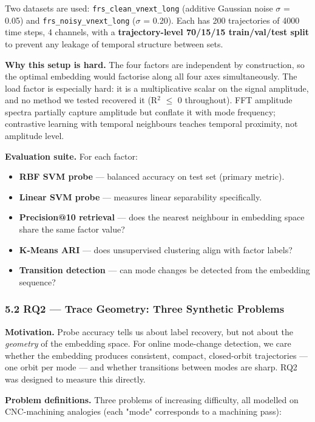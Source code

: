 \documentclass[11pt,a4paper]{article}
\begin{document}
Two datasets are used: \texttt{frs\_clean\_vnext\_long} (additive Gaussian noise $\sigma$ = 0.05) and
\texttt{frs\_noisy\_vnext\_long} ($\sigma$ = 0.20). Each has 200 trajectories of 4000 time steps, 4 channels,
with a \textbf{trajectory-level 70/15/15 train/val/test split} to prevent any leakage of temporal
structure between sets.

\textbf{Why this setup is hard.} The four factors are independent by construction, so the optimal
embedding would factorise along all four axes simultaneously. The load factor is especially hard:
it is a multiplicative scalar on the signal amplitude, and no method we tested recovered it
(R$^2$ $\leq$ 0 throughout). FFT amplitude spectra partially capture amplitude but conflate it with mode
frequency; contrastive learning with temporal neighbours teaches temporal proximity, not amplitude
level.

\textbf{Evaluation suite.} For each factor:
\begin{itemize}
  \item \textbf{RBF SVM probe} --- balanced accuracy on test set (primary metric).
  \item \textbf{Linear SVM probe} --- measures linear separability specifically.
  \item \textbf{Precision@10 retrieval} --- does the nearest neighbour in embedding space share the same factor value?
  \item \textbf{K-Means ARI} --- does unsupervised clustering align with factor labels?
  \item \textbf{Transition detection} --- can mode changes be detected from the embedding sequence?
\end{itemize}

\subsubsection{5.2 RQ2 --- Trace Geometry: Three Synthetic Problems}

\textbf{Motivation.} Probe accuracy tells us about label recovery, but not about the \textit{geometry} of the
embedding space. For online mode-change detection, we care whether the embedding produces
consistent, compact, closed-orbit trajectories --- one orbit per mode --- and whether transitions
between modes are sharp. RQ2 was designed to measure this directly.

\textbf{Problem definitions.} Three problems of increasing difficulty, all modelled on CNC-machining
analogies (each "mode" corresponds to a machining pass):
\end{document}
